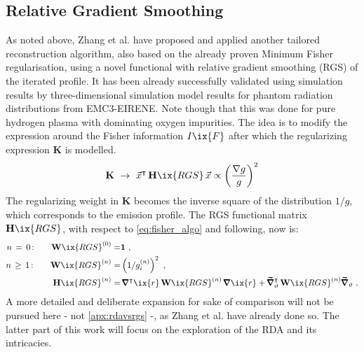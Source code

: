        \subsection{Relative Gradient Smoothing}\label{apx:rgs}%
%
            As noted above, Zhang et al.\cite{Zhang2013,Zhang2021_2} have proposed and applied another tailored reconstruction algorithm, also based on the already proven\cite{Anton1996} Minimum Fisher regularisation, using a novel functional with relative gradient
            smoothing (RGS) of the iterated profile. It has been already successfully validated using simulation results by three-dimensional simulation model results for phantom radiation distributions from EMC3-EIRENE\cite{Zhang2021_2}. Note though that this was done for pure hydrogen plasma with dominating oxygen impurities. The idea is to modify the expression around the Fisher information $I\ix{F}$ after which the regularizing expression $\mathbf{K}$ is modelled.%
%
            \begin{align}%
                \mathbf{K}\,\,\to\,\,\vec{x}^{\intercal}\,\mathbf{H}\ix{RGS}\,\vec{x}\propto\left(\frac{\nabla g}{g}\right)^{2}%
            \end{align}\label{eq:baseRGS}%
%
            The regularizing weight in $\mathbf{K}$ becomes the inverse square of the distribution $1/g$, which corresponds to the emission profile. The RGS functional matrix $\mathbf{H}\ix{RGS}$, with respect to \cref{eq:fisher_algo} and following, now is:%
%
            \begin{align}%
                \begin{split}%
                    n\,=\,0\,\text{:}\qquad\mathbf{W}\ix{RGS}^{\left(0\right)}=&\mathbf{1}\,\,,\\%
                    n\,\ge\,1\,\text{:}\qquad\mathbf{W}\ix{RGS}^{\left(n\right)}=&\left(1/g_{i}^{\left(n\right)}\right)^{2}\,\,,\\
                    \mathbf{H}\ix{RGS}^{\left(n\right)}=&\,\pmb{\nabla}^{\intercal}\ix{r}\,\mathbf{W}\ix{RGS}^{\left(n\right)}\,\pmb{\nabla}\ix{r}+\pmb{\widetilde{\nabla}}^{\intercal}_{\vartheta}\,\mathbf{W}\ix{RGS}^{\left(n\right)}\pmb{\widetilde{\nabla}}_{\vartheta}\,\,.%
                \end{split}%
            \end{align}%
%
        A more detailed and deliberate expansion for sake of comparison will not be pursued here - not \cref{apx:rdavsrgs} -, as Zhang et al.\cite{Zhang2021_2} have already done so. The latter part of this work will focus on the exploration of the RDA and its intricacies.\\%
%
